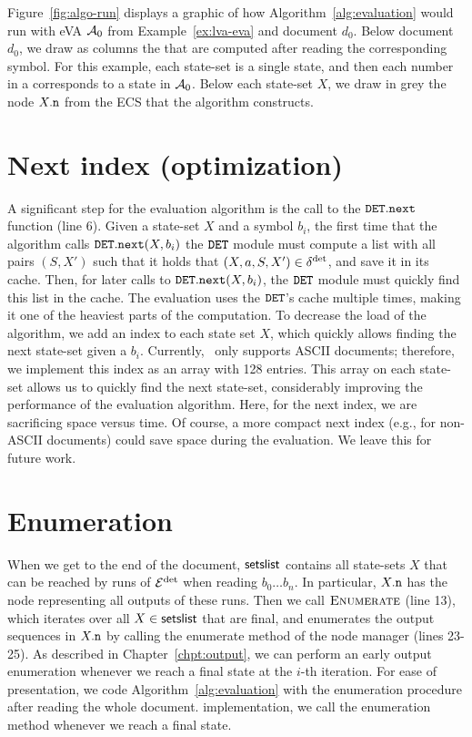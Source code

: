 \begin{example}
	Figure~\ref{fig:algo-run} displays a graphic of how
	Algorithm~\ref{alg:evaluation} would run with eVA $\mathcal{A}_0$ from
	Example~\ref{ex:lva-eva} and document $d_0$. Below document $d_0$, we draw
	as columns the \cstateslistss{} that are computed after reading the
	corresponding symbol. For this example, each state-set is a single state,
	and then each number in a \cstateslists{} corresponds to a state in $\mathcal{A}_0$.
	Below each state-set $X$, we draw in grey the node $X.\mathtt{n}$ from the ECS
	that the algorithm constructs.
\end{example}

\section{Next index (optimization)}
A significant step for the evaluation algorithm is the call to the
$\mathtt{DET}.\texttt{next}$ function (line 6). Given a state-set $X$ and a symbol
$b_i$, the first time that the algorithm calls $\mathtt{DET}.\texttt{next}(X, b_i)$ the
$\mathtt{DET}$ module must compute a list with all pairs $(S, X')$ such that it holds
that $(X,a,S,X') \in \delta^{\operatorname{det}}$, and save it in its cache. Then, for later
calls to  $\mathtt{DET}.\texttt{next}(X, b_i)$, the $\mathtt{DET}$ module must quickly find
this list in the cache. The evaluation uses the $\mathtt{DET}$'s cache multiple times,
making it  one of the heaviest parts of the computation. To decrease the load of
the algorithm, we add an index to each state set $X$, which quickly allows
finding the next state-set given a $b_i$. Currently, \rematch\ only supports
ASCII documents; therefore, we implement this index as an array with 128
entries. This array on each state-set allows us to quickly find the next
state-set, considerably improving the performance of the evaluation algorithm.
Here, for the next index, we are sacrificing space versus time. Of course, a
more compact next index (e.g., for non-ASCII documents) could save space during
the evaluation. We leave this for future work.

\section{Enumeration}
When we get to the end of the document, $\textsf{setslist}$ contains all state-sets
$X$ that can be reached by runs of $\mathcal{E}^{\operatorname{det}}$ when reading $b_0 \ldots b_n$. In
particular, $X.\mathtt{n}$ has the node representing all outputs of these runs. Then
we call $\textproc{Enumerate}$ (line 13), which iterates over all $X \in
\textsf{setslist}$ that are final, and enumerates the output sequences in $X.\mathtt{n}$
by calling the enumerate method of the node manager (lines 23-25).
%
As described in Chapter~\ref{chpt:output}, we can perform an early output
enumeration whenever we reach a final state at the $i$-th iteration. For ease of
presentation, we code Algorithm~\ref{alg:evaluation} with the enumeration
procedure after reading the whole document. %
implementation, we call the enumeration method whenever we reach a final state.


